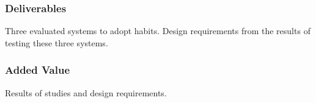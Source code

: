 \subsubsection*{Deliverables}
Three evaluated systems to adopt habits. Design requirements from the results of testing these three systems.


\subsubsection*{Added Value}
Results of studies and design requirements.


